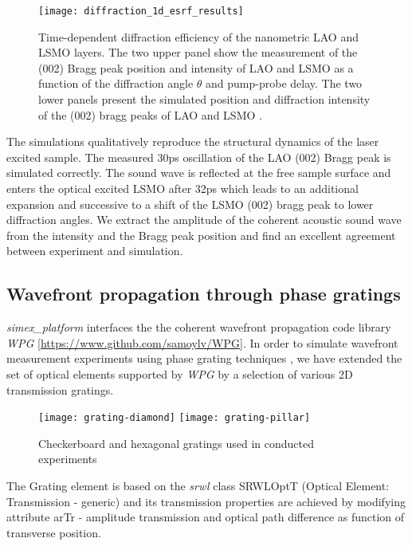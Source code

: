 \documentclass[10pt]{scrartcl}
\begin{document}
\begin{figure}[ht]
    \begin{center}
        \texttt{[image: diffraction\_1d\_esrf\_results]}
    \end{center}
    \caption{Time-dependent diffraction efficiency of the nanometric LAO and
      LSMO layers. The two upper panel show the measurement of the (002) Bragg
      peak position and intensity of LAO and LSMO as a function of the
      diffraction angle $\theta$ and pump-probe delay. The two lower panels
      present the simulated position and diffraction intensity of the (002)
      bragg peaks of LAO and LSMO \cite{Schick2014}.}
    \label{fig:coherent_acoustic_exp_vs_sim}
\end{figure}

The simulations qualitatively reproduce the structural dynamics of the laser excited sample. The measured 30ps oscillation of the LAO (002) Bragg peak is simulated correctly. The sound wave is reflected at the free sample surface and enters the optical excited LSMO after 32ps which leads to an additional expansion and successive to a shift of the LSMO (002) bragg peak to lower diffraction angles. We extract the amplitude of the coherent acoustic sound wave from the intensity and the Bragg peak position and find an excellent agreement between experiment and  simulation.

\subsection{Wavefront propagation through phase gratings}
\label{sec:wpg_phasegrating}
\textit{simex\_platform} interfaces the the coherent wavefront propagation code
library \textit{WPG} [\url{https://www.github.com/samoylv/WPG}]. In order to
simulate wavefront measurement experiments using phase grating techniques
\cite{}, we have extended the set of optical elements supported by \textit{WPG}
by a selection of various 2D transmission gratings.
%
\begin{figure}[ht]
	\begin{center}
		\texttt{[image: grating-diamond]}
		\texttt{[image: grating-pillar]}
	\end{center}
	\caption{Checkerboard and hexagonal gratings used in conducted experiments}
	\label{fig:lm_gratings}
\end{figure}
%
The Grating element is based on the \textit{srwl} class SRWLOptT (Optical Element: Transmission - generic) and its transmission properties are achieved by modifying attribute arTr - amplitude transmission and optical path difference as function of transverse position.
\end{document}

